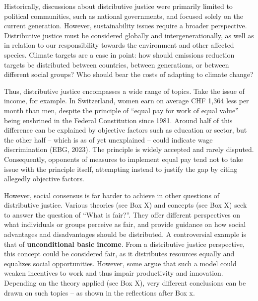 \documentclass[
  a4paper,
  openany]{book}
\begin{document}
Historically, discussions about distributive justice were primarily
limited to political communities, such as national governments, and
focused solely on the current generation. However, sustainability issues
require a broader perspective. Distributive justice must be considered
globally and intergenerationally, as well as in relation to our
responsibility towards the environment and other affected species.
Climate targets are a case in point: how should emissions reduction
targets be distributed between countries, between generations, or
between different social groups? Who should bear the costs of adapting
to climate change?

Thus, distributive justice encompasses a wide range of topics. Take the
issue of income, for example. In Switzerland, women earn on average CHF
1,364 less per month than men, despite the principle of ``equal pay for
work of equal value'' being enshrined in the Federal Constitution since
1981. Around half of this difference can be explained by objective
factors such as education or sector, but the other half -- which is as
of yet unexplained -- could indicate wage discrimination (EBG, 2023).
The principle is widely accepted and rarely disputed. Consequently,
opponents of measures to implement equal pay tend not to take issue with
the principle itself, attempting instead to justify the gap by citing
allegedly objective factors.

However, social consensus is far harder to achieve in other questions of
distributive justice. Various theories (see Box X) and concepts (see Box
X) seek to answer the question of ``What is fair?''. They offer
different perspectives on what individuals or groups perceive as fair,
and provide guidance on how social advantages and disadvantages should
be distributed. A controversial example is that of \textbf{unconditional
basic income}. From a distributive justice perspective, this concept
could be considered fair, as it distributes resources equally and
equalizes social opportunities. However, some argue that such a model
could weaken incentives to work and thus impair productivity and
innovation. Depending on the theory applied (see Box X), very different
conclusions can be drawn on such topics -- as shown in the reflections
after Box x.
\end{document}

